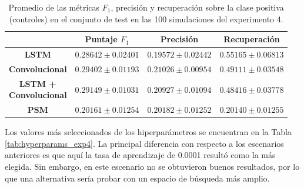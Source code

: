 \documentclass[../../main.tex]{subfiles}
\begin{document}
\begin{table}[H]
    \centering
    \renewcommand{\arraystretch}{1.2}
    \begin{tabular}{|c|c|c|c|}
        \hline
         & \textbf{Puntaje} \(F_1\) & \textbf{Precisión} & \textbf{Recuperación} \\ \hline\hline
        \textbf{LSTM}
            & $0.28642 \pm 0.02401$ & $0.19572 \pm 0.02442$ & $\mathbf{0.55165 \pm 0.06813}$ \\ \hline
        \textbf{Convolucional}
            & $\mathbf{0.29402 \pm 0.01193}$ & $\mathbf{0.21026 \pm 0.00954}$ & $0.49111 \pm 0.03548$ \\ \hline
        \makecell{\textbf{LSTM +} \\ \textbf{Convolucional}}
            & $0.29149 \pm 0.01031$ & $0.20927 \pm 0.01094$ & $0.48416 \pm 0.03778$ \\ \hline
        \textbf{PSM}
            & $0.20161 \pm 0.01254$ & $0.20182 \pm 0.01252$ & $0.20140 \pm 0.01255$ \\
        \hline
    \end{tabular}
    \caption{Promedio de las métricas \(F_1\), precisión y recuperación sobre la
    clase positiva (controles) en el conjunto de test en las 100 simulaciones del
    experimento 4.}
    \label{tab:results_exp4}
\end{table}

Los valores más seleccionados de los hiperparámetros se encuentran en la Tabla
\ref{tab:hyperparams_exp4}. La principal diferencia con respecto a los escenarios
anteriores es que aquí la tasa de aprendizaje de 0.0001 resultó como la más elegida. Sin
embargo, en este escenario no se obtuvieron buenos resultados, por lo que una alternativa
sería probar con un espacio de búsqueda más amplio.
\end{document}
